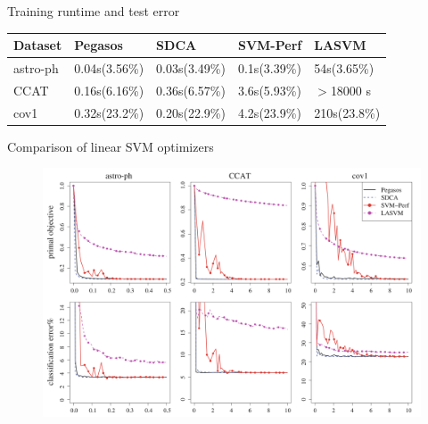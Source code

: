 \begin{frame}{Training runtime and test error}
\begin{table}[ht]
    \centering
    \begin{tabular}{lllll}
            \hline
            Dataset & Pegasos & SDCA & SVM-Perf & LASVM \\ \hline 
            astro-ph & 0.04s(3.56\%) & 0.03s(3.49\%) & 0.1s(3.39\%) & 54s(3.65\%) \\ 
            CCAT & 0.16s(6.16\%) & 0.36s(6.57\%) & 3.6s(5.93\%) & $>$18000 s  \\ 
            cov1 & 0.32s(23.2\%) & 0.20s(22.9\%) & 4.2s(23.9\%) & 210s(23.8\%) \\ \hline
        \end{tabular}
    \end{table}
\end{frame}

\begin{frame}{Comparison of linear SVM optimizers}
    \begin{figure}[htbp]
        \centering
        \includegraphics[height=0.7\textheight, width=\textwidth]{images/comp1.png}
    \end{figure}
\end{frame}

